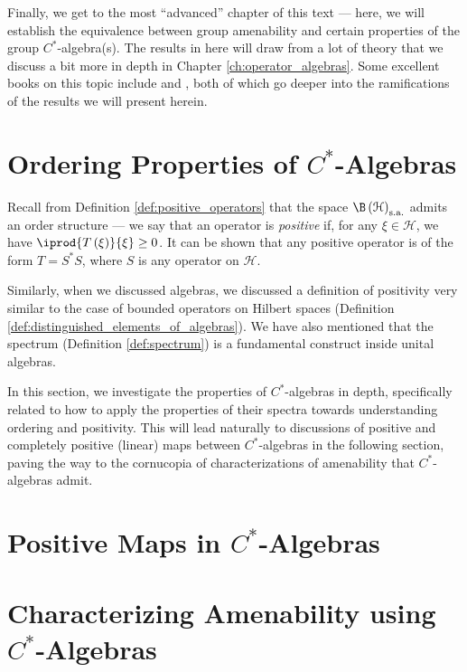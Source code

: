 Finally, we get to the most ``advanced'' chapter of this text --- here, we will establish the equivalence between group amenability and certain properties of the group $C^{\ast}$-algebra(s). The results in here will draw from a lot of theory that we discuss a bit more in depth in Chapter \ref{ch:operator_algebras}. Some excellent books on this topic include \cite{brown_and_ozawa} and \cite{completely_bounded_maps_and_operator_algebras}, both of which go deeper into the ramifications of the results we will present herein.
\section{Ordering Properties of $C^{\ast}$-Algebras}%
Recall from Definition \ref{def:positive_operators} that the space $\B\left( \mathcal{H} \right)_{\sa}$ admits an order structure --- we say that an operator is \textit{positive} if, for any $\xi\in \mathcal{H}$, we have $ \iprod{T\left( \xi \right)}{\xi} \geq 0 $. It can be shown that any positive operator is of the form $T = S^{\ast}S$, where $S$ is any operator on $\mathcal{H}$.\newline

Similarly, when we discussed algebras, we discussed a definition of positivity very similar to the case of bounded operators on Hilbert spaces (Definition \ref{def:distinguished_elements_of_algebras}). We have also mentioned that the spectrum (Definition \ref{def:spectrum}) is a fundamental construct inside unital algebras.\newline

In this section, we investigate the properties of $C^{\ast}$-algebras in depth, specifically related to how to apply the properties of their spectra towards understanding ordering and positivity. This will lead naturally to discussions of positive and completely positive (linear) maps between $C^{\ast}$-algebras in the following section, paving the way to the cornucopia of characterizations of amenability that $C^{\ast}$-algebras admit.
\section{Positive Maps in \texorpdfstring{$C^{\ast}$-Algebras}{C*-Algebras}}%

\section{Characterizing Amenability using \texorpdfstring{$C^{\ast}$-Algebras}{C*-Algebras}}%
